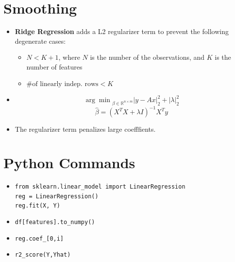\documentclass{article}
\begin{document}
\section{Smoothing}
\begin{itemize}
    \item \textbf{Ridge Regression} adds a L2 regularizer term to prevent the following degenerate cases:
    \begin{itemize}
        \item $N < K+1$, where $N$ is the number of the observations, and $K$ is the number of features
        \item $\text{\# of linearly indep. rows} < K$
    \end{itemize}
    \item 
    \[
        {\arg\min}_{\beta \in \mathbb{R}^{n \times m}} |y - Ax|^2_2 + |\lambda|^2_2
    \]
    \[
        \hat{\beta} = (X^TX + \lambda I)^{-1}X^Ty 
    \]
    \item The regularizer term penalizes large coefffients.
\end{itemize}

\section{Python Commands}
\begin{itemize}
    \item \texttt{from sklearn.linear\_model import LinearRegression} \\
          \texttt{reg = LinearRegression()} \\
          \texttt{reg.fit(X, Y)}
    \item \texttt{df[features].to\_numpy()}
    \item \texttt{reg.coef\_[0,i]}
    \item \texttt{r2\_score(Y,Yhat)}
\end{itemize}
\end{document}

